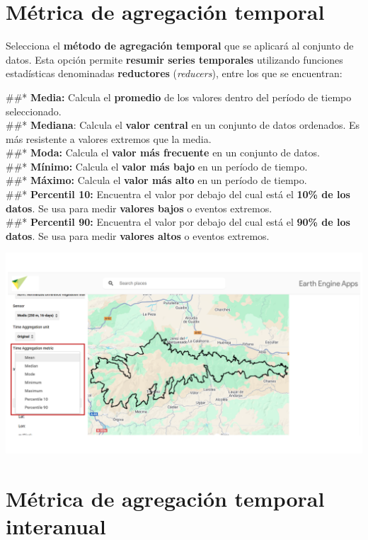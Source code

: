 \documentclass[
]{book}
\begin{document}
\chapter{Métrica de agregación temporal}\label{agregacion-temporal}

Selecciona el \textbf{método de agregación temporal} que se aplicará al conjunto de datos. Esta opción permite \textbf{resumir series temporales} utilizando funciones estadísticas denominadas \textbf{reductores} (\emph{reducers}), entre los que se encuentran:

\#\#* \textbf{Media:} Calcula el \textbf{promedio} de los valores dentro del período de tiempo seleccionado.\\
\#\#* \textbf{Mediana}: Calcula el \textbf{valor central} en un conjunto de datos ordenados. Es más resistente a valores extremos que la media.\\
\#\#* \textbf{Moda:} Calcula el \textbf{valor más frecuente} en un conjunto de datos.\\
\#\#* \textbf{Mínimo:} Calcula el \textbf{valor más bajo} en un período de tiempo.\\
\#\#* \textbf{Máximo:} Calcula el \textbf{valor más alto} en un período de tiempo.\\
\#\#* \textbf{Percentil 10:} Encuentra el valor por debajo del cual está el \textbf{10\% de los datos}. Se usa para medir \textbf{valores bajos} o eventos extremos.\\
\#\#* \textbf{Percentil 90:} Encuentra el valor por debajo del cual está el \textbf{90\% de los datos}. Se usa para medir \textbf{valores altos} o eventos extremos.

\includegraphics{assets/aggregationTime.png}

\chapter{Métrica de agregación temporal interanual}\label{agregacion-temporal-interanual}
\end{document}
